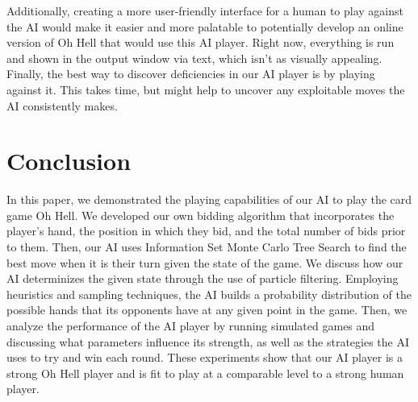 \documentclass{article}
\begin{document}
Additionally, creating a more user-friendly interface for a human to play against the AI would make it easier and more palatable to potentially develop an online version of Oh Hell that would use this AI player. Right now, everything is run and shown in the output window via text, which isn't as visually appealing. Finally, the best way to discover deficiencies in our AI player is by playing against it. This takes time, but might help to uncover any exploitable moves the AI consistently makes.


\section{Conclusion}
\label{section:Conclusion}
In this paper, we demonstrated the playing capabilities of our AI to play the card game Oh Hell. We developed our own bidding algorithm that incorporates the player's hand, the position in which they bid, and the total number of bids prior to them. Then, our AI uses Information Set Monte Carlo Tree Search to find the best move when it is their turn given the state of the game. We discuss how our AI determinizes the given state through the use of particle filtering. Employing heuristics and sampling techniques, the AI builds a probability distribution of the possible hands that its opponents have at any given point in the game. Then, we analyze the performance of the AI player by running simulated games and discussing what parameters influence its strength, as well as the strategies the AI uses to try and win each round. 
These experiments show that our AI player is a strong Oh Hell player and is fit to play at a comparable level to a strong human player.



\end{document}

